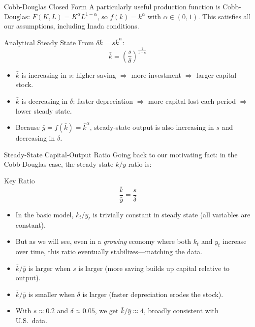 \documentclass[aspectratio=169,10pt]{beamer}
\newcommand{\apxbutton}[1]{\hfill\hyperlink{#1}{\beamerbutton{Appendix}}}
\begin{document}
\begin{frame}{Cobb-Douglas Closed Form}
\hypertarget{m-a4}{}
A particularly useful production function is Cobb-Douglas: $F(K,L)=K^{\alpha}L^{1-\alpha}$, so $f(k)=k^{\alpha}$ with $\alpha\in(0,1)$. This satisfies all our assumptions, including Inada conditions.

\begin{block}{Analytical Steady State}
From $\delta\bar{k} = s\bar{k}^{\alpha}$:
\[
\bar{k}=\left(\frac{s}{\delta}\right)^{\frac{1}{1-\alpha}} \tag{3.6}
\]
\end{block}
\begin{itemize}
  \item $\bar{k}$ is increasing in $s$: higher saving $\Rightarrow$ more investment $\Rightarrow$ larger capital stock.
  \item $\bar{k}$ is decreasing in $\delta$: faster depreciation $\Rightarrow$ more capital lost each period $\Rightarrow$ lower steady state.
  \item Because $\bar{y}=f(\bar{k})=\bar{k}^{\alpha}$, steady-state output is also increasing in $s$ and decreasing in $\delta$.
\end{itemize}
\apxbutton{a4}
\end{frame}

\begin{frame}{Steady-State Capital-Output Ratio}
\hypertarget{m-a6}{}
Going back to our motivating fact: in the Cobb-Douglas case, the steady-state $k/y$ ratio is:
\begin{block}{Key Ratio}
\[
\frac{\bar{k}}{\bar{y}} = \frac{s}{\delta}
\]
\end{block}
\begin{itemize}
  \item In the basic model, $k_t/y_t$ is trivially constant in steady state (all variables are constant).
  \item But as we will see, even in a \emph{growing} economy where both $k_t$ and $y_t$ increase over time, this ratio eventually stabilizes---matching the data.
  \item $\bar{k}/\bar{y}$ is larger when $s$ is larger (more saving builds up capital relative to output).
  \item $\bar{k}/\bar{y}$ is smaller when $\delta$ is larger (faster depreciation erodes the stock).
  \item With $s\approx 0.2$ and $\delta\approx 0.05$, we get $\bar{k}/\bar{y}\approx 4$, broadly consistent with U.S.\ data.
\end{itemize}
\apxbutton{a6}
\end{frame}
\end{document}

